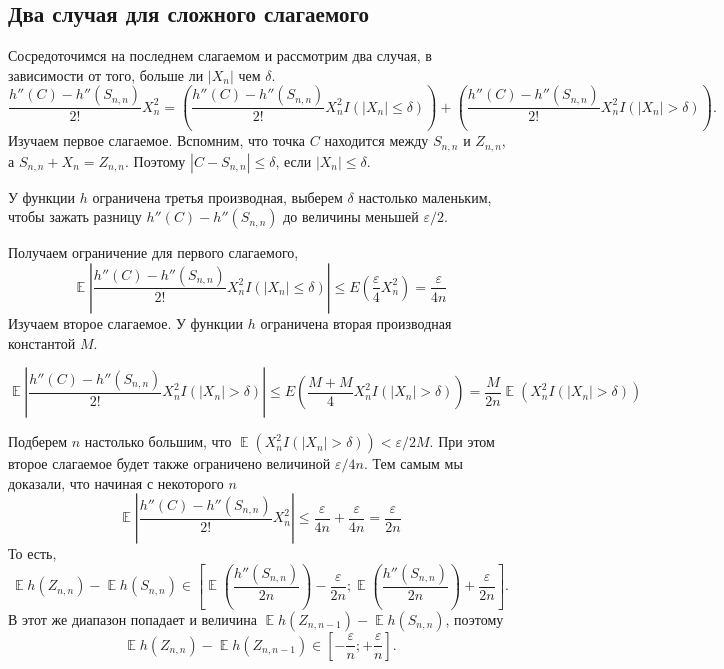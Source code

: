 \documentclass[
  letterpaper,
  DIV=11,
  numbers=noendperiod]{scrartcl}
\begin{document}
\subsection{Два случая для сложного
слагаемого}\label{ux434ux432ux430-ux441ux43bux443ux447ux430ux44f-ux434ux43bux44f-ux441ux43bux43eux436ux43dux43eux433ux43e-ux441ux43bux430ux433ux430ux435ux43cux43eux433ux43e}

Сосредоточимся на последнем слагаемом и рассмотрим два случая, в
зависимости от того, больше ли \(\left\lvert X_n \right\rvert\) чем
\(\delta\). \[
\frac{h''(C) - h''(S_{n,n})}{2!}X_n^2 = \left(\frac{h''(C) - h''(S_{n,n})}{2!}X_n^2I(\left\lvert X_n \right\rvert \leq \delta)\right) + \left(\frac{h''(C) - h''(S_{n,n})}{2!}X_n^2I(\left\lvert X_n \right\rvert > \delta)\right).
\] Изучаем первое слагаемое. Вспомним, что точка \(C\) находится между
\(S_{n,n}\) и \(Z_{n,n}\), а \(S_{n,n} + X_n = Z_{n,n}\). Поэтому
\(\left\lvert C - S_{n,n} \right\rvert \leq \delta\), если
\(\left\lvert X_n \right\rvert\leq \delta\).

У функции \(h\) ограничена третья производная, выберем \(\delta\)
настолько маленьким, чтобы зажать разницу \(h''(C) - h''(S_{n,n})\) до
величины меньшей \(\varepsilon/2\).

Получаем ограничение для первого слагаемого, \[
\mathop{\mathrm{\mathbb{E}}}\left\lvert \frac{h''(C) - h''(S_{n,n})}{2!}X_n^2I(\left\lvert X_n \right\rvert \leq \delta) \right\rvert \leq E\left(\frac{\varepsilon}{4}X_n^2\right)=\frac{\varepsilon}{4n}
\] Изучаем второе слагаемое. У функции \(h\) ограничена вторая
производная константой \(M\).

\[
\mathop{\mathrm{\mathbb{E}}}\left\lvert \frac{h''(C) - h''(S_{n,n})}{2!}X_n^2I(\left\lvert X_n \right\rvert > \delta) \right\rvert \leq E\left(\frac{M + M}{4}X_n^2I(\left\lvert X_n \right\rvert > \delta)\right)=\frac{M}{2n}\mathop{\mathrm{\mathbb{E}}}(X_n^2I(\left\lvert X_n \right\rvert > \delta))
\]

Подберем \(n\) настолько большим, что
\(\mathop{\mathrm{\mathbb{E}}}(X_n^2 I(\left\lvert X_n \right\rvert > \delta)) < \varepsilon/2M\).
При этом второе слагаемое будет также ограничено величиной
\(\varepsilon/4n\). Тем самым мы доказали, что начиная с некоторого
\(n\) \[
\mathop{\mathrm{\mathbb{E}}}\left\lvert \frac{h''(C) - h''(S_{n,n})}{2!}X_n^2  \right\rvert \leq \frac{\varepsilon}{4n} + \frac{\varepsilon}{4n} = \frac{\varepsilon}{2n}
\] То есть, \[
\mathop{\mathrm{\mathbb{E}}}h(Z_{n,n}) - \mathop{\mathrm{\mathbb{E}}}h(S_{n,n}) \in \left[ \mathop{\mathrm{\mathbb{E}}}\left(\frac{h''(S_{n,n})}{2n}\right) - \frac{\varepsilon}{2n}; \mathop{\mathrm{\mathbb{E}}}\left(\frac{h''(S_{n,n})}{2n}\right) + \frac{\varepsilon}{2n} \right].
\] В этот же диапазон попадает и величина
\(\mathop{\mathrm{\mathbb{E}}}h(Z_{n,n-1}) - \mathop{\mathrm{\mathbb{E}}}h(S_{n,n})\),
поэтому \[
\mathop{\mathrm{\mathbb{E}}}h(Z_{n,n}) - \mathop{\mathrm{\mathbb{E}}}h(Z_{n,n-1}) \in \left[ - \frac{\varepsilon}{n}; + \frac{\varepsilon}{n} \right].
\]
\end{document}
